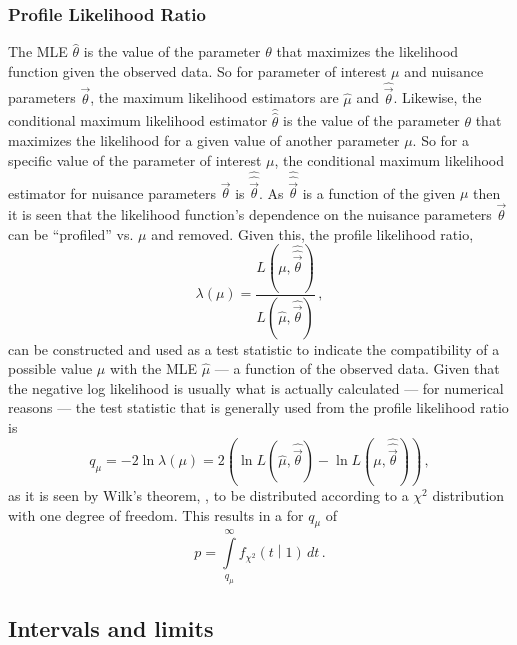 \subsubsection{Profile Likelihood Ratio}

The \gls{MLE} $\hat{\theta}$ is the value of the parameter $\theta$ that maximizes the likelihood function given the observed data.
So for parameter of interest $\mu$ and nuisance parameters $\vec{\theta}$, the maximum likelihood estimators are $\hat{\mu}$ and $\hat{\vec{\theta}}$.
Likewise, the conditional maximum likelihood estimator $\hat{\hat{\theta}}$ is the value of the parameter $\theta$ that maximizes the likelihood for a given value of another parameter $\mu$.
So for a specific value of the parameter of interest $\mu$, the conditional maximum likelihood estimator for nuisance parameters $\vec{\theta}$ is $\hat{\hat{\vec{\theta}}}$.
As $\hat{\hat{\vec{\theta}}}$ is a function of the given $\mu$ then it is seen that the likelihood function's dependence on the nuisance parameters $\vec{\theta}$ can be ``profiled'' vs. $\mu$ and removed.
Given this, the profile likelihood ratio,
\begin{equation}
 \lambda\left(\mu\right) = \frac{L\left(\mu, \hat{\hat{\vec{\theta}}}\right)}{L\left(\hat{\mu}, \hat{\vec{\theta}}\right)}\,,
 \label{eq:profile_likelihood_ratio}
\end{equation}
can be constructed and used as a test statistic to indicate the compatibility of a possible value $\mu$ with the MLE $\hat{\mu}$ --- a function of the observed data.
Given that the negative log likelihood is usually what is actually calculated --- for numerical reasons --- the test statistic that is generally used from the profile likelihood ratio is
\begin{equation}
 q_{\mu} = -2 \ln \lambda\left(\mu\right) = 2 \left(\ln L\left(\hat{\mu}, \hat{\vec{\theta}}\right) - \ln L\left(\mu, \hat{\hat{\vec{\theta}}}\right)\right)\,,
 \label{eq:q_mu}
\end{equation}
as it is seen by Wilk's theorem, , to be distributed according to a $\chi^{2}$ distribution with one degree of freedom.
This results in a \pvalue{} for $q_{\mu}$ of
\begin{equation}
 p = \int\limits_{q_{\mu}}^{\infty} f_{\chi^{2}}\left(t\middle|1\right)\,dt\,.
 \label{eq:q_mu_pvalue}
\end{equation}

\subsection{Intervals and limits}\label{section:intervals_and_limits}


